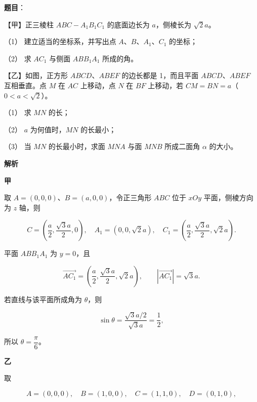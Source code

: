 \begin{answer}

\textbf{题目}：

【甲】正三棱柱 $ABC-A_1B_1C_1$ 的底面边长为 $a$，侧棱长为 $\sqrt2a$。
\nopagebreak[4]
\begin{center}\end{center}
\nopagebreak[4]
（1） 建立适当的坐标系，并写出点 $A\text{、}B\text{、}A_1\text{、}C_1$ 的坐标；

（2） 求 $AC_1$ 与侧面 $ABB_1A_1$ 所成的角。

【乙】如图，正方形 $ABCD\text{、}ABEF$ 的边长都是 1，而且平面 $ABCD\text{、}ABEF$ 互相垂直。点 $M$ 在 $AC$ 上移动，点 $N$ 在 $BF$ 上移动，若 $CM=BN=a$（$0<a<\sqrt2$）。
\nopagebreak[4]
\begin{center}\end{center}
\nopagebreak[4]
（1） 求 $MN$ 的长；

（2） $a$ 为何值时，$MN$ 的长最小；

（3） 当 $MN$ 的长最小时，求面 $MNA$ 与面 $MNB$ 所成二面角 $\alpha$ 的大小。

\textbf{解析}

\textbf{甲}


取 $A=(0,0,0)$、$B=(a,0,0)$，令正三角形 $ABC$ 位于 $xOy$ 平面，侧棱方向为 $z$ 轴，则

\nopagebreak[4]
\[
C=\left(\frac a2,\frac{\sqrt3a}{2},0\right),\quad
A_1=(0,0,\sqrt2a),\quad
C_1=\left(\frac a2,\frac{\sqrt3a}{2},\sqrt2a\right).
\]


平面 $ABB_1A_1$ 为 $y=0$，且

\nopagebreak[4]
\[
\overrightarrow{AC_1}
=\left(\frac a2,\frac{\sqrt3a}{2},\sqrt2a\right),\qquad
|\overrightarrow{AC_1}|=\sqrt3a.
\]

若直线与该平面所成角为 $\theta$，则

\nopagebreak[4]
\[
\sin\theta=\frac{\sqrt3a/2}{\sqrt3a}=\frac12,
\]

所以 $\theta=\dfrac\pi6$。

\textbf{乙}


取

\nopagebreak[4]
\[
A=(0,0,0),\quad B=(1,0,0),\quad C=(1,1,0),\quad D=(0,1,0),
\]


\end{answer}
